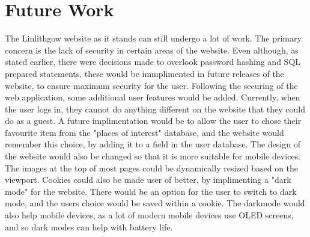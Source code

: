 \documentclass[12pt,a4paper]{article}
\begin{document}
	\section{Future Work}
	The Linlithgow website as it stands can still undergo a lot of work. The primary concern is the lack of security in certain areas of the website. Even although, as stated earlier, there were decisions made to overlook password hashing and SQL prepared statements, these would be immplimented in future releases of the website, to ensure maximum security for the user. Following the securing of the web application, some additional user features would be added. Currently, when the user logs in, they cannot do anything different on the website that they could do as a guest. A future implimentation would be to allow the user to chose their favourite item from the "places of interest" database, and the website would remember this choice, by adding it to a field in the user database. The design of the website would also be changed so that it is more suitable for mobile devices. The images at the top of most pages could be dynamically resized based on the viewport. Cookies could also be made user of better, by implimenting a "dark mode" for the website. There would be an option for the user to switch to dark mode, and the users choice would be saved within a cookie. The darkmode would also help mobile devices, as a lot of modern mobile devices use OLED screens, and so dark modes can help with battery life.

	\clearpage






\end{document}
